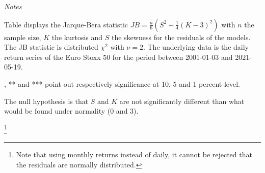 \documentclass[a4paper, nobind]{templates/ociamthesis}
\begin{document}
\begin{landscape}\begin{table}[h!]

\caption{\label{tab:JBTable}Jarque-Bera Test on standardized residuals}
\centering
\begin{threeparttable}
\begin{tablenotes}[para]
\item \textit{Notes} 
\item Table displays the Jarque-Bera statistic $JB=\frac{n}{6}(S^{2}+\frac{1}{4}(K-3)^{2})$ with $n$ the sample size, $K$ the kurtosis and $S$ the skewness for the residuals of the models. The JB statistic is distributed $\chi^2$ with $\nu = 2$. The underlying data is the daily return series of the Euro Stoxx 50 for the period between 2001-01-03 and 2021-05-19.
\item *, ** and *** point out respectively significance at 10, 5 and 1 percent level.
\item The null hypothesis is that $S$ and $K$ are not significantly different than what would be found under normality (0 and 3).
\end{tablenotes}
\end{threeparttable}
\end{table}
\end{landscape}

\footnote{Note that using monthly returns instead of daily, it cannot be rejected that the residuals are normally distributed.}
\end{document}
